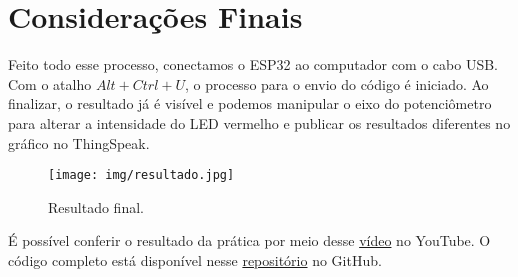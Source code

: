 \section{Considerações Finais}

Feito todo esse processo, conectamos o ESP32 ao computador com o cabo USB. Com o atalho $Alt+Ctrl+U$, o processo para o envio do código é iniciado. Ao finalizar, o resultado já é visível e podemos manipular o eixo do potenciômetro para alterar a intensidade do LED vermelho e publicar os resultados diferentes no gráfico no ThingSpeak.

\begin{figure}[H]
    \centering
    \texttt{[image: img/resultado.jpg]}
    \caption{Resultado final.}
    \label{fig:result}
\end{figure}

É possível conferir o resultado da prática por meio desse \href{https://youtu.be/2tGOsjk8wQs}{vídeo} no YouTube. O código completo está disponível nesse \href{https://github.com/fabricio-araujo94/microcontroladores/tree/main/potenciometro}{repositório} no GitHub.